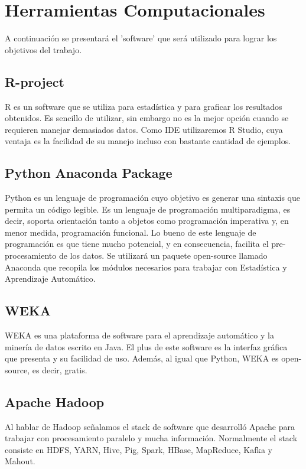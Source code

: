 \section{Herramientas Computacionales}
A continuación se presentará el 'software' que será utilizado para lograr los objetivos del trabajo.
\subsection{R-project\cite{rproject}}
R es un software que se utiliza para estadística y para graficar los resultados obtenidos. Es sencillo de utilizar, sin embargo no es la mejor opción cuando se requieren manejar demasiados datos. 
Como IDE utilizaremos R Studio, cuya  ventaja es la facilidad de su manejo incluso con bastante cantidad de ejemplos.
\subsection{Python Anaconda Package\cite{python}}
Python es un lenguaje de programación cuyo objetivo es generar una sintaxis que permita un código legible. Es un lenguaje de programación multiparadigma, es decir, soporta orientación tanto a objetos como programación imperativa y, en menor medida, programación funcional.
Lo bueno de este lenguaje de programación es que tiene mucho potencial, y en consecuencia, facilita el pre-procesamiento de los datos.
Se utilizará un paquete open-source llamado Anaconda que recopila los módulos necesarios para trabajar con Estadística y Aprendizaje Automático.
\subsection{WEKA\cite{weka}}
WEKA es una plataforma de software para el aprendizaje automático y la minería de datos escrito en Java.
El plus de este software es la interfaz gráfica que presenta y su facilidad de uso. Además, al igual que Python, WEKA es open-source, es decir, gratis. 
\subsection{Apache Hadoop\cite{hadoop}}
Al hablar de Hadoop señalamos el stack de software que desarrolló Apache para trabajar con procesamiento paralelo y mucha información. Normalmente el stack consiste en HDFS, YARN, Hive, Pig, Spark, HBase, MapReduce, Kafka y Mahout.